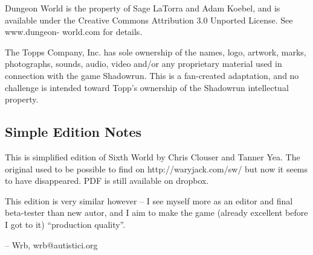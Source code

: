 Dungeon World is the property of Sage LaTorra and Adam Koebel, and is available under the Creative Commons Attribution 3.0 Unported License. See www.dungeon- world.com for details.

The Topps Company, Inc. has sole ownership of the names, logo, artwork, marks, photographs, sounds, audio, video and/or any proprietary material used in connection with the game Shadowrun. This is a fan-created adaptation, and no challenge is intended toward Topp’s ownership of the Shadowrun intellectual property.

\subsection{Simple Edition Notes}

This is simplified edition of Sixth World by Chris Clouser and Tanner Yea. The original used to be possible to find on http://waryjack.com/sw/ but now it seems to have disappeared. PDF is still available on dropbox.

This edition is very similar however – I see myself more as an editor and final beta-tester than new autor, and I aim to make the game (already excellent before I got to it) “production quality”.

– Wrb, wrb@autistici.org